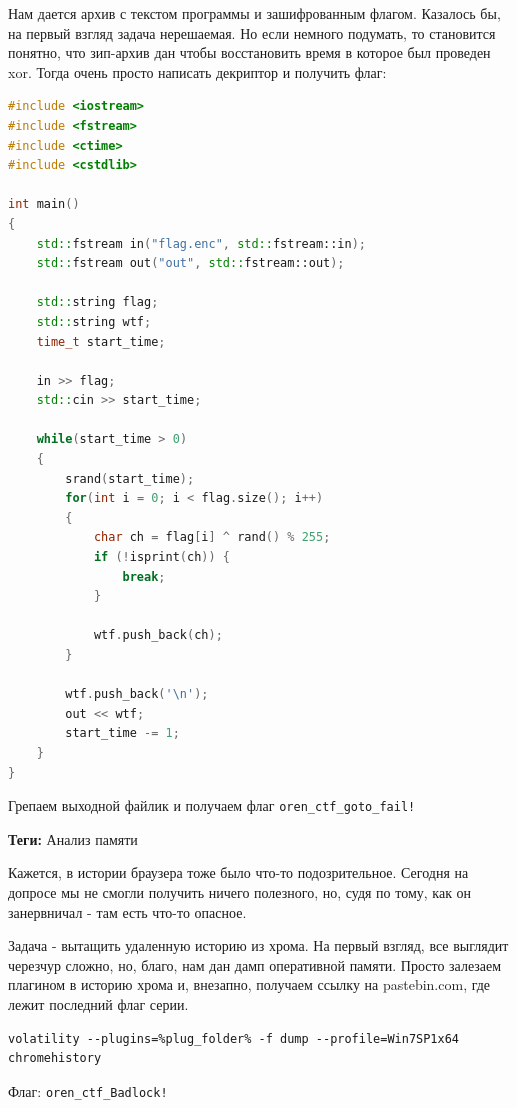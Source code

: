 \documentclass[idxtotoc,hyperref,openany,oneside]{files/forensics} %
\begin{document}
Нам дается архив с текстом программы и зашифрованным флагом. Казалось бы, на первый взгляд задача нерешаемая. Но если немного подумать, то становится понятно, что зип-архив дан чтобы восстановить время в которое был проведен xor. Тогда очень просто написать декриптор и получить флаг:
\begin{lstlisting}[language=C++,
					directivestyle={\color{black}}
					emph={int,char,double,float,unsigned},
					emphstyle={\color{blue}}
					]
#include <iostream>
#include <fstream>
#include <ctime>
#include <cstdlib>

int main()
{
    std::fstream in("flag.enc", std::fstream::in);
    std::fstream out("out", std::fstream::out);

 	std::string flag;
 	std::string wtf;
 	time_t start_time;

    in >> flag;
    std::cin >> start_time;

 	while(start_time > 0)
 	{
  		srand(start_time);
  		for(int i = 0; i < flag.size(); i++)
 	 	{
            char ch = flag[i] ^ rand() % 255;
            if (!isprint(ch)) {
                break;
            }
    		
            wtf.push_back(ch);
  		} 
  	
        wtf.push_back('\n');
		out << wtf;
  		start_time -= 1;
 	} 
}	
\end{lstlisting}
				   
Грепаем выходной файлик и получаем флаг \verb|oren_ctf_goto_fail!|




\textbf{Теги:} Анализ памяти\vspace{\baselineskip}

\begin{tcolorbox}
Кажется, в истории браузера тоже было что-то подозрительное. Сегодня на допросе мы не смогли получить ничего полезного, но, судя по тому, как он занервничал - там есть что-то опасное.
\end{tcolorbox}

Задача - вытащить удаленную историю из хрома. На первый взгляд, все выглядит черезчур сложно, но, благо, нам дан дамп оперативной памяти. Просто залезаем плагином в историю хрома и, внезапно, получаем ссылку на pastebin.com, где лежит последний флаг серии.

\begin{verbatim}
volatility --plugins=%plug_folder% -f dump --profile=Win7SP1x64 chromehistory
\end{verbatim}

Флаг: \verb|oren_ctf_Badlock!|

\end{document}

